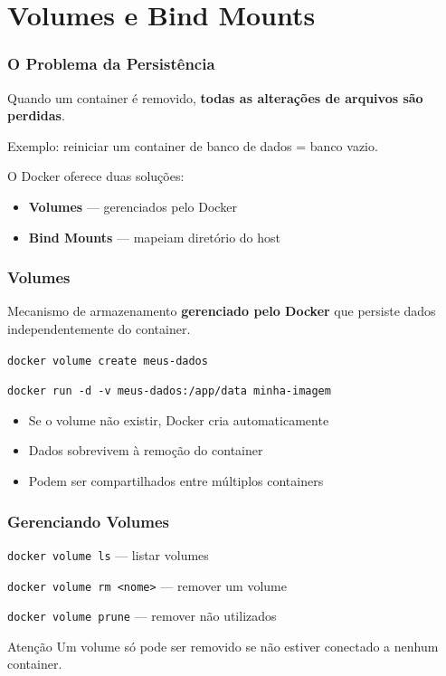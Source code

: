 \section{Volumes e Bind Mounts}

\begin{frame}
  \frametitle{O Problema da Persistência}
  Quando um container é removido, \textbf{todas as alterações de arquivos são perdidas}.

  \vspace{0.5em}
  Exemplo: reiniciar um container de banco de dados = banco vazio.

  \vspace{0.8em}
  O Docker oferece duas soluções:
  \begin{itemize}
    \item \textbf{Volumes} — gerenciados pelo Docker
    \item \textbf{Bind Mounts} — mapeiam diretório do host
  \end{itemize}
\end{frame}

\begin{frame}
  \frametitle{Volumes}
  Mecanismo de armazenamento \textbf{gerenciado pelo Docker} que persiste dados independentemente do container.

  \vspace{0.5em}
  \texttt{docker volume create meus-dados}

  \vspace{0.3em}
  \texttt{docker run -d -v meus-dados:/app/data minha-imagem}

  \vspace{0.8em}
  \begin{itemize}
    \item Se o volume não existir, Docker cria automaticamente
    \item Dados sobrevivem à remoção do container
    \item Podem ser compartilhados entre múltiplos containers
  \end{itemize}
\end{frame}

\begin{frame}
  \frametitle{Gerenciando Volumes}
  \texttt{docker volume ls} \hspace{2.5em} — listar volumes

  \vspace{0.3em}
  \texttt{docker volume rm <nome>} \hspace{0.3em} — remover um volume

  \vspace{0.3em}
  \texttt{docker volume prune} \hspace{1.3em} — remover não utilizados

  \vspace{0.5em}
  \begin{alertblock}{Atenção}
    Um volume só pode ser removido se não estiver conectado a nenhum container.
  \end{alertblock}
\end{frame}

